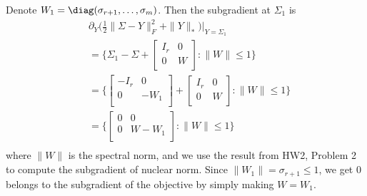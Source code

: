 Denote $W_1=\diag(\sigma_{r+1},\dots,\sigma_m)$.
Then the subgradient at $\Sigma_1$ is
\begin{equation}
\begin{split}
    & \partial_Y\bigg(\frac{1}{2}\|\Sigma-Y\|_F^2+\|Y\|_*\bigg)\bigg|_{Y=\Sigma_1} \\
    &= \bigg\{\Sigma_1 - \Sigma +
    \begin{bmatrix}
        I_r  & 0 \\
        0    & W \\
    \end{bmatrix}: \|W\|\le 1 \bigg\} \\
    &= \bigg\{\begin{bmatrix}
        -I_r  & 0 \\
        0    & -W_1 \\
    \end{bmatrix} +
    \begin{bmatrix}
        I_r  & 0 \\
        0    & W \\
    \end{bmatrix}: \|W\|\le 1 \bigg\} \\
    &= \bigg\{\begin{bmatrix}
        0    & 0 \\
        0    & W - W_1 \\
    \end{bmatrix}: \|W\|\le 1 \bigg\} \\
\end{split}
\end{equation}
where $\|W\|$ is the spectral norm,
and we use the result from HW2, Problem 2 to compute the subgradient
of nuclear norm.
Since $\|W_1\|=\sigma_{r+1}\le 1$,
we get $0$ belongs to the subgradient of the objective
by simply making $W=W_1$.
